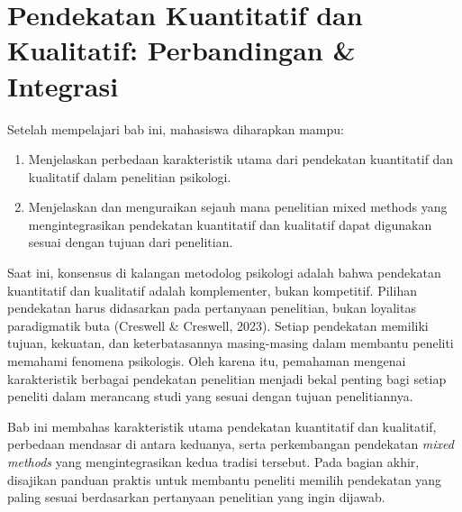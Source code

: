 \documentclass[
  indonesian,
  letterpaper,
  DIV=11,
  numbers=noendperiod]{scrreprt}
\providecommand{\tightlist}{%
  \setlength{\itemsep}{0pt}\setlength{\parskip}{0pt}}
\begin{document}
\chapter{Pendekatan Kuantitatif dan Kualitatif: Perbandingan \&
Integrasi}\label{chap-pendekatan}

\begin{tcolorbox}[enhanced jigsaw, colframe=quarto-callout-note-color-frame, toptitle=1mm, breakable, leftrule=.75mm, arc=.35mm, toprule=.15mm, colback=white, colbacktitle=quarto-callout-note-color!10!white, bottomtitle=1mm, bottomrule=.15mm, titlerule=0mm, title=\textcolor{quarto-callout-note-color}{\faInfo}\hspace{0.5em}{Tujuan Pembelajaran}, coltitle=black, left=2mm, opacitybacktitle=0.6, opacityback=0, rightrule=.15mm]

Setelah mempelajari bab ini, mahasiswa diharapkan mampu:

\begin{enumerate}
\def\labelenumi{\arabic{enumi}.}
\tightlist
\item
  Menjelaskan perbedaan karakteristik utama dari pendekatan kuantitatif
  dan kualitatif dalam penelitian psikologi.
\item
  Menjelaskan dan menguraikan sejauh mana penelitian mixed methods yang
  mengintegrasikan pendekatan kuantitatif dan kualitatif dapat digunakan
  sesuai dengan tujuan dari penelitian.
\end{enumerate}

\end{tcolorbox}

Saat ini, konsensus di kalangan metodolog psikologi adalah bahwa
pendekatan kuantitatif dan kualitatif adalah komplementer, bukan
kompetitif. Pilihan pendekatan harus didasarkan pada pertanyaan
penelitian, bukan loyalitas paradigmatik buta (Creswell \& Creswell,
2023). Setiap pendekatan memiliki tujuan, kekuatan, dan keterbatasannya
masing-masing dalam membantu peneliti memahami fenomena psikologis. Oleh
karena itu, pemahaman mengenai karakteristik berbagai pendekatan
penelitian menjadi bekal penting bagi setiap peneliti dalam merancang
studi yang sesuai dengan tujuan penelitiannya.

Bab ini membahas karakteristik utama pendekatan kuantitatif dan
kualitatif, perbedaan mendasar di antara keduanya, serta perkembangan
pendekatan \emph{mixed methods} yang mengintegrasikan kedua tradisi
tersebut. Pada bagian akhir, disajikan panduan praktis untuk membantu
peneliti memilih pendekatan yang paling sesuai berdasarkan pertanyaan
penelitian yang ingin dijawab.
\end{document}
